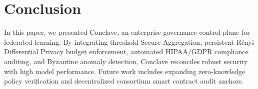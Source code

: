 \section{Conclusion}
\label{sec:conclusion}

In this paper, we presented Conclave, an enterprise governance control plane for federated learning. By integrating threshold Secure Aggregation, persistent Rényi Differential Privacy budget enforcement, automated HIPAA/GDPR compliance auditing, and Byzantine anomaly detection, Conclave reconciles robust security with high model performance. Future work includes expanding zero-knowledge policy verification and decentralized consortium smart contract audit anchors.
